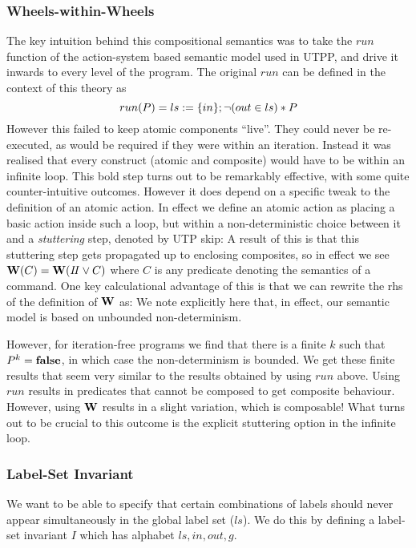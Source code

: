 \subsubsection{Wheels-within-Wheels}

The key intuition behind this compositional semantics was to take the
$run$ function of the action-system based semantic model used in UTPP,
and drive it inwards to every level of the program.
The original $run$ can be defined in the context of this theory as
\[
  run(P) = ls := \{in\} ; \lnot (out \in ls) * P
\]
However this failed to keep atomic components ``live''.
They could never be re-executed,
as would be required if they were within an iteration.
Instead it was realised that every construct (atomic and composite)
would have to be within an infinite loop.
This bold step turns out to be remarkably effective,
with some quite counter-intuitive outcomes.
However it does depend on a specific tweak to the
definition of an atomic action.
In effect we define an atomic action
as placing a basic action inside such a loop,
but within a non-deterministic choice between it
and a \emph{stuttering} step, denoted by UTP skip:
A result of this is that this stuttering step gets
propagated up to enclosing composites,
so in effect we see $\mathbf{W}(C)=\mathbf{W}(I\!I\lor C)$
where $C$ is any predicate denoting the semantics of a command.
One key calculational advantage of this is that we can rewrite
the rhs of the definition of $\mathbf{W}$ as:
%
We note explicitly here that, in effect,
our semantic model is based on unbounded non-determinism.

However, for iteration-free programs
we find that there is a finite $k$ such that $P^k = \mathbf{false}$,
in which case the non-determinism is bounded.
We get these finite results that seem very similar
to the results obtained by using $run$ above.
Using $run$ results in predicates that cannot be composed
to get composite behaviour.
However, using $\mathbf{W}$ results in a slight variation,
which is composable!
What turns out to be crucial
to this outcome is the explicit stuttering option in the infinite loop.

\subsubsection{Label-Set Invariant}

We want to be able to specify that certain combinations
of labels should never appear simultaneously
in the global label set ($ls$).
We do this by defining a label-set invariant $I$
which has alphabet $ls,in,out,g$.

